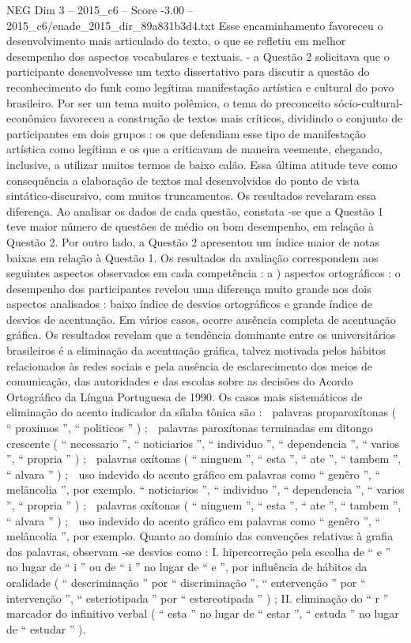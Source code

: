 \begin{textsample}{NEG Dim 3 – 2015\_c6 – Score -3.00 – 2015\_c6/enade\_2015\_dir\_89a831b3d4.txt}
Esse encaminhamento favoreceu o desenvolvimento mais articulado do texto, o que se refletiu em melhor desempenho dos aspectos vocabulares e textuais. - a Questão 2 solicitava que o participante desenvolvesse um texto dissertativo para discutir a questão do reconhecimento do funk como legítima manifestação artística e cultural do povo brasileiro.
Por ser um tema muito polêmico, o tema do preconceito sócio-cultural-econômico favoreceu a construção de textos mais críticos, dividindo o conjunto de participantes em dois grupos : os que defendiam esse tipo de manifestação artística como legítima e os que a criticavam de maneira veemente, chegando, inclusive, a utilizar muitos termos de baixo calão.
Essa última atitude teve como consequência a elaboração de textos mal desenvolvidos do ponto de vista sintático-discursivo, com muitos truncamentos.
Os resultados revelaram essa diferença.
Ao analisar os dados de cada questão, constata -se que a Questão 1 teve maior número de questões de médio ou bom desempenho, em relação à Questão 2.
Por outro lado, a Questão 2 apresentou um índice maior de notas baixas em relação à Questão 1.
Os resultados da avaliação correspondem aos seguintes aspectos observados em cada competência : a ) aspectos ortográficos : o desempenho dos participantes revelou uma diferença muito grande nos dois aspectos analisados : baixo índice de desvios ortográficos e grande índice de desvios de acentuação.
Em vários casos, ocorre ausência completa de acentuação gráfica.
Os resultados revelam que a tendência dominante entre os universitários brasileiros é a eliminação da acentuação gráfica, talvez motivada pelos hábitos relacionados às redes sociais e pela ausência de esclarecimento dos meios de comunicação, das autoridades e das escolas sobre as decisões do Acordo Ortográfico da Língua Portuguesa de 1990.
Os casos mais sistemáticos de eliminação do acento indicador da sílaba tônica são :  palavras proparoxítonas ( “ proximos ”, “ politicos ” ) ;  palavras paroxítonas terminadas em ditongo crescente ( “ necessario ”, “ noticiarios ”, “ individuo ”, “ dependencia ”, “ varios ”, “ propria ” ) ;  palavras oxítonas ( “ ninguem ”, “ esta ”, “ ate ”, “ tambem ”, “ alvara ” ) ;  uso indevido do acento gráfico em palavras como “ genêro ”, “ melâncolia ”, por exemplo. “ noticiarios ”, “ individuo ”, “ dependencia ”, “ varios ”, “ propria ” ) ;  palavras oxítonas ( “ ninguem ”, “ esta ”, “ ate ”, “ tambem ”, “ alvara ” ) ;  uso indevido do acento gráfico em palavras como “ genêro ”, “ melâncolia ”, por exemplo.
Quanto ao domínio das convenções relativas à grafia das palavras, observam -se desvios como : I. hipercorreção pela escolha de “ e ” no lugar de “ i ” ou de “ i ” no lugar de “ e ”, por influência de hábitos da oralidade ( “ descriminação ” por “ discriminação ”, “ entervenção ” por “ intervenção ”, “ esteriotipada ” por “ estereotipada ” ) ; II. eliminação do “ r ” marcador do infinitivo verbal ( “ esta ” no lugar de “ estar ”, “ estuda ” no lugar de “ estudar ” ).

\end{textsample}
